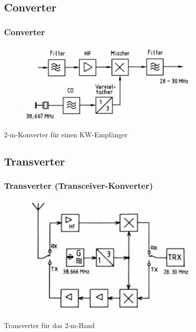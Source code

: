 \subsection{Converter}

\begin{frame}
  \frametitle{Converter}

  \begin{center}
    \begin{figure}
      \includegraphics[width=0.8\textwidth,height=.7\textheight,keepaspectratio]{a13/TF204.png}
    \end{figure}
  \end{center}

  2-m-Konverter für einen KW-Empfänger

\end{frame}

\subsection{Transverter}

\begin{frame}
  \frametitle{Transverter (Transceiver-Konverter)}

  \begin{center}
    \begin{figure}
      \includegraphics[width=0.8\textwidth,height=.6\textheight,keepaspectratio]{a13/TF209.png}
    \end{figure}
  \end{center}

  Transverter für das 2-m-Band

\end{frame}

